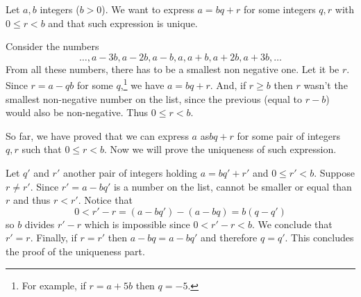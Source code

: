 \documentclass[12pt]{article}
\begin{document}
Let $a,b$ integers ($b>0$). We want to express $a=bq+r$ for some integers $q,r$ with $0\leq r < b$ and that such expression is unique.

Consider the numbers
$$\ldots, a-3b, a-2b, a-b,a,a+b,a+2b,a+3b,\ldots$$
From all these numbers, there has to be a smallest non negative one. Let it be $r$. 
Since $r=a-qb$ for some $q$,\footnote{For example, if $r =a+5b$ then $q=-5$.} we have $a=bq+r$. And, if $r\geq b$ then $r$ wasn't the smallest non-negative number on the list, since the previous (equal to $r-b$) would also be non-negative. Thus $0\leq r<b$.

So far, we have proved that we can express $a$ as$bq+r$ for some pair of integers $q,r$ such that $0\leq r<b$. Now we  will prove the uniqueness of such expression.


Let $q'$ and $r'$ another pair of integers holding $a=bq'+r'$ and $0\leq r' <b$. Suppose $r\neq r'$. Since $r' = a-bq'$ is a number on the list, cannot be smaller or equal than $r$ and thus $r<r'$. Notice that 
$$0<r'-r =(a-bq') - (a-bq) = b(q-q')$$
so $b$ divides $r'-r$ which is impossible since $0<r'-r < b$. We conclude that $r'=r$. 
Finally, if $r=r'$ then $a-bq = a-bq'$ and therefore $q=q'$. This concludes the proof of the uniqueness part.
\end{document}
